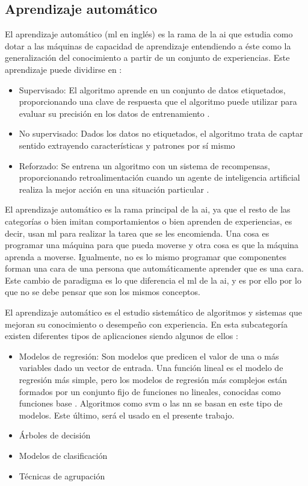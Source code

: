 \subsection{Aprendizaje automático}

El aprendizaje automático (\acrfull{ml} en inglés) es la rama de la \acrshort{ai} que estudia como dotar a las máquinas de capacidad de aprendizaje entendiendo a éste como la generalización del conocimiento a partir de un conjunto de experiencias. Este aprendizaje puede dividirse en \cite{amodernapproach}:
\begin{itemize}
\item Supervisado: El algoritmo aprende en un conjunto de datos etiquetados, proporcionando una clave de respuesta que el algoritmo puede utilizar para evaluar su precisión en los datos de entrenamiento \cite{nvidia}.
\item No supervisado: Dados los datos no etiquetados, el algoritmo trata de captar sentido extrayendo características y patrones por sí mismo
\item Reforzado: Se entrena un algoritmo con un sistema de recompensas, proporcionando retroalimentación cuando un agente de inteligencia artificial realiza la mejor acción en una situación particular \cite{nvidia}. \end{itemize}

El aprendizaje automático es la rama principal de la \acrshort{ai}, ya que el resto de las categorías o bien imitan comportamientos o bien aprenden de experiencias, es decir, usan \acrfull{ml} para realizar la tarea que se les encomienda. Una cosa es programar una máquina para que pueda moverse y otra cosa es que la máquina aprenda a moverse. Igualmente, no es lo mismo programar que componentes forman una cara de una persona que automáticamente aprender que es una cara. Este cambio de paradigma es lo que diferencia el \acrshort{ml} de la \acrshort{ai}, y es por ello por lo que no se debe pensar que son los mismos conceptos.
\newline

El aprendizaje automático es el estudio sistemático de algoritmos y sistemas que mejoran su conocimiento o desempeño con experiencia. En esta subcategoría existen diferentes tipos de aplicaciones siendo algunos de ellos \cite{amodernapproach}:
\begin{itemize}
\item Modelos de regresión: Son modelos que predicen el valor de una o más variables dado un vector de entrada. Una función lineal es el modelo de regresión más simple, pero los modelos de regresión más complejos están formados por un conjunto fijo de funciones no lineales, conocidas como funciones base \cite{flach}. Algoritmos como \acrfull{svm} o las \acrfull{nn} se basan en este tipo de modelos. Este último, será el usado en el presente trabajo.
\item Árboles de decisión
\item Modelos de clasificación
\item Técnicas de agrupación
\end{itemize}

